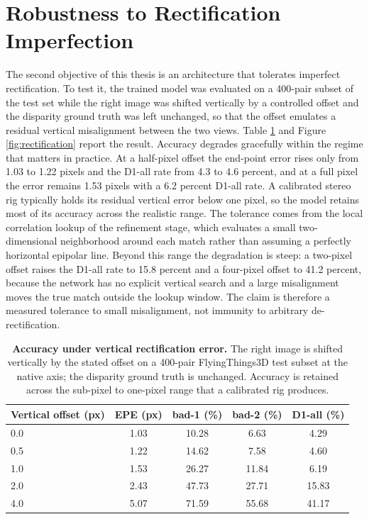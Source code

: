 \section{Robustness to Rectification Imperfection}
\label{sec:rectification}
The second objective of this thesis is an architecture that tolerates
imperfect rectification. To test it, the trained model was evaluated on a
400-pair subset of the test set while the right image was shifted
vertically by a controlled offset and the disparity ground truth was left
unchanged, so that the offset emulates a residual vertical misalignment
between the two views. Table \ref{tab:rectification} and Figure
\ref{fig:rectification} report the result. Accuracy degrades gracefully
within the regime that matters in practice. At a half-pixel offset the
end-point error rises only from 1.03 to 1.22 pixels and the D1-all rate
from 4.3 to 4.6 percent, and at a full pixel the error remains 1.53 pixels
with a 6.2 percent D1-all rate. A calibrated stereo rig typically holds
its residual vertical error below one pixel, so the model retains most of
its accuracy across the realistic range. The tolerance comes from the
local correlation lookup of the refinement stage, which evaluates a small
two-dimensional neighborhood around each match rather than assuming a
perfectly horizontal epipolar line. Beyond this range the degradation is
steep: a two-pixel offset raises the D1-all rate to 15.8 percent and a
four-pixel offset to 41.2 percent, because the network has no explicit
vertical search and a large misalignment moves the true match outside the
lookup window. The claim is therefore a measured tolerance to small
misalignment, not immunity to arbitrary de-rectification.

\begin{table}[!htbp]
\centering
\caption{\textbf{Accuracy under vertical rectification error.} The right image is shifted vertically by the stated offset on a 400-pair FlyingThings3D test subset at the native axis; the disparity ground truth is unchanged. Accuracy is retained across the sub-pixel to one-pixel range that a calibrated rig produces.}
\label{tab:rectification}
\small
\begin{tabular}{lcccc}
\toprule
Vertical offset (px) & EPE (px) & bad-1 (\%) & bad-2 (\%) & D1-all (\%)\\
\midrule
0.0 & 1.03 & 10.28 & 6.63 & 4.29\\
0.5 & 1.22 & 14.62 & 7.58 & 4.60\\
1.0 & 1.53 & 26.27 & 11.84 & 6.19\\
2.0 & 2.43 & 47.73 & 27.71 & 15.83\\
4.0 & 5.07 & 71.59 & 55.68 & 41.17\\
\bottomrule
\end{tabular}
\end{table}

